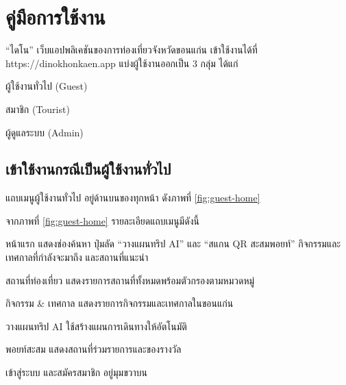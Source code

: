 
\section{คู่มือการใช้งาน}

``ไดโน'' เว็บแอปพลิเคชันของการท่องเที่ยวจังหวัดขอนแก่น เข้าใช้งานได้ที่ https://dinokhonkaen.app แบ่งผู้ใช้งานออกเป็น 3 กลุ่ม ได้แก่

\begin{numlist}
\item ผู้ใช้งานทั่วไป (Guest)
\item สมาชิก (Tourist)
\item ผู้ดูแลระบบ (Admin)
\end{numlist}

\subsection{เข้าใช้งานกรณีเป็นผู้ใช้งานทั่วไป}

แถบเมนูผู้ใช้งานทั่วไป อยู่ด้านบนของทุกหน้า ดังภาพที่ \ref{fig:guest-home}


จากภาพที่ \ref{fig:guest-home} รายละเอียดแถบเมนูมีดังนี้

\begin{numlist}
\item หน้าแรก แสดงช่องค้นหา ปุ่มลัด ``วางแผนทริป AI'' และ ``สแกน QR สะสมพอยท์'' กิจกรรมและเทศกาลที่กำลังจะมาถึง และสถานที่แนะนำ
\item สถานที่ท่องเที่ยว แสดงรายการสถานที่ทั้งหมดพร้อมตัวกรองตามหมวดหมู่
\item กิจกรรม \& เทศกาล แสดงรายการกิจกรรมและเทศกาลในขอนแก่น
\item วางแผนทริป AI ใช้สร้างแผนการเดินทางให้อัตโนมัติ
\item พอยท์สะสม แสดงสถานที่ร่วมรายการและของรางวัล
\item เข้าสู่ระบบ และสมัครสมาชิก อยู่มุมขวาบน
\end{numlist}

